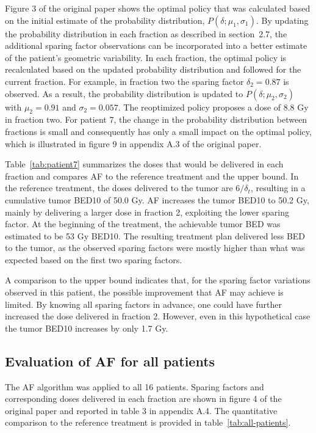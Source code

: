 \documentclass[11pt]{article}
\begin{document}
Figure 3 of the original paper shows the optimal policy that was calculated based on the initial estimate of the probability distribution, $P(\delta; \mu_1, \sigma_1)$. By updating the probability distribution in each fraction as described in section~2.7, the additional sparing factor observations can be incorporated into a better estimate of the patient's geometric variability. In each fraction, the optimal policy is recalculated based on the updated probability distribution and followed for the current fraction. For example, in fraction two the sparing factor $\delta_2 = 0.87$ is observed. As a result, the probability distribution is updated to $P(\delta; \mu_2, \sigma_2)$ with $\mu_2 = 0.91$ and $\sigma_2 = 0.057$. The reoptimized policy proposes a dose of 8.8 Gy in fraction two. For patient 7, the change in the probability distribution between fractions is small and consequently has only a small impact on the optimal policy, which is illustrated in figure 9 in appendix A.3 of the original paper.

Table~\ref{tab:patient7} summarizes the doses that would be delivered in each fraction and compares AF to the reference treatment and the upper bound. In the reference treatment, the doses delivered to the tumor are $6/\delta_t$, resulting in a cumulative tumor BED10 of 50.0 Gy. AF increases the tumor BED10 to 50.2 Gy, mainly by delivering a larger dose in fraction 2, exploiting the lower sparing factor. At the beginning of the treatment, the achievable tumor BED was estimated to be 53 Gy BED10. The resulting treatment plan delivered less BED to the tumor, as the observed sparing factors were mostly higher than what was expected based on the first two sparing factors.

A comparison to the upper bound indicates that, for the sparing factor variations observed in this patient, the possible improvement that AF may achieve is limited. By knowing all sparing factors in advance, one could have further increased the dose delivered in fraction 2. However, even in this hypothetical case the tumor BED10 increases by only 1.7 Gy.

\subsection{Evaluation of AF for all patients}

The AF algorithm was applied to all 16 patients. Sparing factors and corresponding doses delivered in each fraction are shown in figure 4 of the original paper and reported in table 3 in appendix A.4. The quantitative comparison to the reference treatment is provided in table~\ref{tab:all-patients}.
\end{document}
